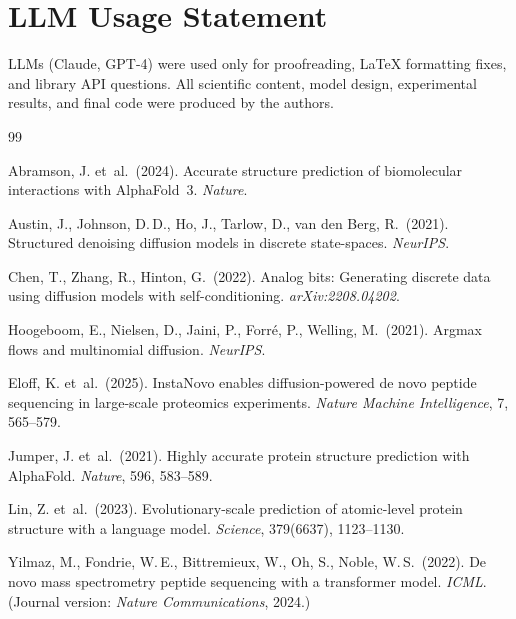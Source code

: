 \documentclass{article}
\begin{document}
\section*{LLM Usage Statement}
LLMs (Claude, GPT-4) were used only for proofreading, LaTeX formatting fixes, and library API questions.
All scientific content, model design, experimental results, and final code were produced by the authors.


{\sloppy
\begin{thebibliography}{99}

Abramson, J. et~al.\ (2024).
Accurate structure prediction of biomolecular interactions with AlphaFold~3.
\textit{Nature}.

Austin, J., Johnson, D.\,D., Ho, J., Tarlow, D., van den Berg, R.\ (2021).
Structured denoising diffusion models in discrete state-spaces.
\textit{NeurIPS}.

Chen, T., Zhang, R., Hinton, G.\ (2022).
Analog bits: Generating discrete data using diffusion models with self-conditioning.
\textit{arXiv:2208.04202}.

Hoogeboom, E., Nielsen, D., Jaini, P., Forré, P., Welling, M.\ (2021).
Argmax flows and multinomial diffusion.
\textit{NeurIPS}.

Eloff, K. et~al.\ (2025).
InstaNovo enables diffusion-powered de novo peptide sequencing in large-scale
proteomics experiments.
\textit{Nature Machine Intelligence}, 7, 565--579.

Jumper, J. et~al.\ (2021).
Highly accurate protein structure prediction with AlphaFold.
\textit{Nature}, 596, 583--589.

Lin, Z. et~al.\ (2023).
Evolutionary-scale prediction of atomic-level protein structure with a language model.
\textit{Science}, 379(6637), 1123--1130.

Yilmaz, M., Fondrie, W.\,E., Bittremieux, W., Oh, S., Noble, W.\,S.\ (2022).
De novo mass spectrometry peptide sequencing with a transformer model.
\textit{ICML}. (Journal version: \textit{Nature Communications}, 2024.)


\end{thebibliography}}
\end{document}
